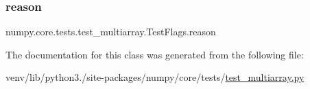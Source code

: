 \subsubsection{\texorpdfstring{reason}{reason}}
{\footnotesize\ttfamily numpy.\+core.\+tests.\+test\+\_\+multiarray.\+Test\+Flags.\+reason\hspace{0.3cm}{\ttfamily [static]}}



The documentation for this class was generated from the following file\+:\begin{DoxyCompactItemize}
\item 
venv/lib/python3./site-\/packages/numpy/core/tests/\hyperlink{core_2tests_2test__multiarray_8py}{test\+\_\+multiarray.\+py}\end{DoxyCompactItemize}
